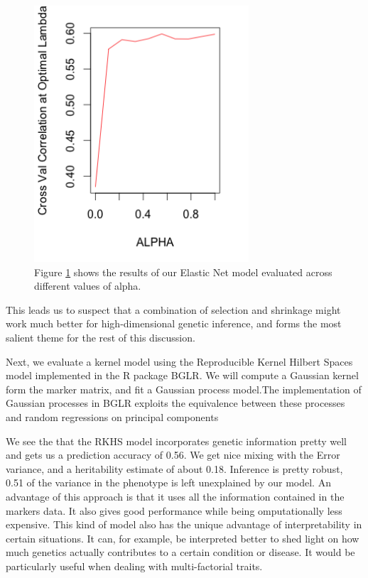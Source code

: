 \documentclass{sig-alternate-05-2015}
\begin{document}
\begin{figure}
  \includegraphics[width=8cm]{./Images/elasticnet.png}
  \centering
  \caption{Figure \ref{fig:elasticnet} shows the results of our Elastic Net model evaluated across different values of alpha.}
  \label{fig:elasticnet}
\end{figure}


This leads us to suspect that a combination of selection and shrinkage might work much better for high-dimensional genetic inference, and forms the most salient theme for
the rest of this discussion.

Next, we evaluate a kernel model using the Reproducible Kernel Hilbert Spaces model implemented in the R package BGLR.
We will compute a Gaussian kernel form the marker matrix, and fit a Gaussian process model.The implementation of Gaussian processes in BGLR exploits
the equivalence between these processes and random regressions on principal components \cite{perez_genome-wide_2014}

We see the that the RKHS model incorporates genetic information pretty well and gets us a prediction accuracy of 0.56.
We get nice mixing with the Error variance, and a heritability estimate of about 0.18. Inference is pretty robust, 0.51 of the variance in the phenotype is left unexplained by our model.
An advantage of this approach is that it uses all the information contained in the markers data. It also gives good performance while being omputationally less expensive.
This kind of model also has the unique advantage of interpretability in certain situations. It can, for example, be interpreted better to shed light on how much genetics actually contributes to a
certain condition or disease. It would be particularly useful when dealing with multi-factorial traits.
\end{document}
